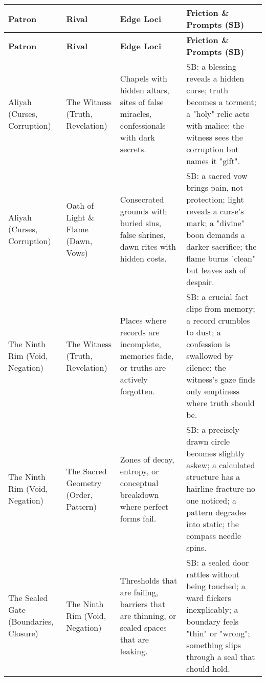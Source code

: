 \begin{longtable}{@{}p{3.3cm}p{3.3cm}p{4.6cm}p{7.2cm}@{}}
  \toprule
  \textbf{Patron} & \textbf{Rival} & \textbf{Edge Loci} & \textbf{Friction \& Prompts (SB)} \\
  \midrule
  \endfirsthead
  
  \toprule
  \textbf{Patron} & \textbf{Rival} & \textbf{Edge Loci} & \textbf{Friction \& Prompts (SB)} \\
  \midrule
  \endhead
  
  \bottomrule
  \endfoot
  
  
  Aliyah (Curses, Corruption) & The Witness (Truth, Revelation) &
  Chapels with hidden altars, sites of false miracles, confessionals with dark secrets. &
  SB: a blessing reveals a hidden curse; truth becomes a torment; a "holy" relic acts with malice; the witness sees the corruption but names it "gift". \\
  
  Aliyah (Curses, Corruption) & Oath of Light \& Flame (Dawn, Vows) &
  Consecrated grounds with buried sins, false shrines, dawn rites with hidden costs. &
  SB: a sacred vow brings pain, not protection; light reveals a curse's mark; a "divine" boon demands a darker sacrifice; the flame burns "clean" but leaves ash of despair. \\
  
  The Ninth Rim (Void, Negation) & The Witness (Truth, Revelation) &
  Places where records are incomplete, memories fade, or truths are actively forgotten. &
  SB: a crucial fact slips from memory; a record crumbles to dust; a confession is swallowed by silence; the witness's gaze finds only emptiness where truth should be. \\
  
  The Ninth Rim (Void, Negation) & The Sacred Geometry (Order, Pattern) &
  Zones of decay, entropy, or conceptual breakdown where perfect forms fail. &
  SB: a precisely drawn circle becomes slightly askew; a calculated structure has a hairline fracture no one noticed; a pattern degrades into static; the compass needle spins. \\
  
  The Sealed Gate (Boundaries, Closure) & The Ninth Rim (Void, Negation) &
  Thresholds that are failing, barriers that are thinning, or sealed spaces that are leaking. &
  SB: a sealed door rattles without being touched; a ward flickers inexplicably; a boundary feels "thin" or "wrong"; something slips through a seal that should hold. \\
  

\end{longtable}

